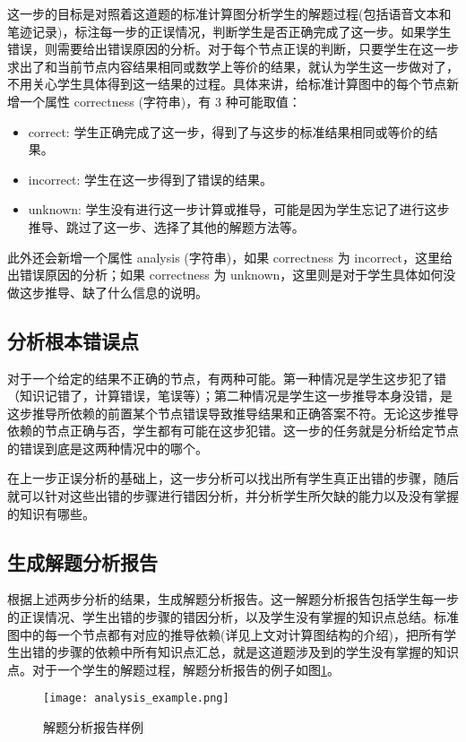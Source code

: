 这一步的目标是对照着这道题的标准计算图分析学生的解题过程(包括语音文本和笔迹记录)，标注每一步的正误情况，判断学生是否正确完成了这一步。如果学生错误，则需要给出错误原因的分析。对于每个节点正误的判断，只要学生在这一步求出了和当前节点内容结果相同或数学上等价的结果，就认为学生这一步做对了，不用关心学生具体得到这一结果的过程。具体来讲，给标准计算图中的每个节点新增一个属性 correctness (字符串)，有 3 种可能取值：

\begin{itemize}
    \item correct: 学生正确完成了这一步，得到了与这步的标准结果相同或等价的结果。
    \item incorrect: 学生在这一步得到了错误的结果。
    \item unknown: 学生没有进行这一步计算或推导，可能是因为学生忘记了进行这步推导、跳过了这一步、选择了其他的解题方法等。
\end{itemize}

此外还会新增一个属性 analysis (字符串)，如果 correctness 为 incorrect，这里给出错误原因的分析；如果 correctness 为 unknown，这里则是对于学生具体如何没做这步推导、缺了什么信息的说明。

\subsection*{分析根本错误点}

对于一个给定的结果不正确的节点，有两种可能。第一种情况是学生这步犯了错（知识记错了，计算错误，笔误等）；第二种情况是学生这一步推导本身没错，是这步推导所依赖的前置某个节点错误导致推导结果和正确答案不符。无论这步推导依赖的节点正确与否，学生都有可能在这步犯错。这一步的任务就是分析给定节点的错误到底是这两种情况中的哪个。

在上一步正误分析的基础上，这一步分析可以找出所有学生真正出错的步骤，随后就可以针对这些出错的步骤进行错因分析，并分析学生所欠缺的能力以及没有掌握的知识有哪些。

\subsection*{生成解题分析报告}

根据上述两步分析的结果，生成解题分析报告。这一解题分析报告包括学生每一步的正误情况、学生出错的步骤的错因分析，以及学生没有掌握的知识点总结。标准图中的每一个节点都有对应的推导依赖(详见上文对计算图结构的介绍)，把所有学生出错的步骤的依赖中所有知识点汇总，就是这道题涉及到的学生没有掌握的知识点。对于一个学生的解题过程，解题分析报告的例子如图\ref{fig:analysis_example}。

\begin{figure}
    \centering
    \texttt{[image: analysis\_example.png]}
    \caption{解题分析报告样例}
    \label{fig:analysis_example}
\end{figure}
